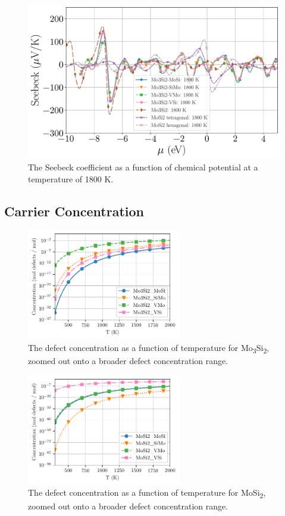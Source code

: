 \documentclass[7.5pt]{article}
\theoremstyle{plain}
\theoremstyle{definition}
\newcommand{\<}{\langle}
\renewcommand{\>}{\rangle}
\begin{document}
\begin{figure}[b!]
\centering
\includegraphics[width=\linewidth]{allmats_S_mu_temp_p}
\caption{The Seebeck coefficient as a function of chemical potential at a temperature of 1800 K.}
\label{fig:S-mu}
\end{figure}

\pagebreak
\clearpage
\subsection{Carrier Concentration}

\begin{figure}[b!]
\centering
  \includegraphics[width=0.6\textwidth]{mo3si2defects}
  \caption{The defect concentration as a function of temperature for Mo\textsubscript{3}Si\textsubscript{2}, zoomed out onto a broader defect concentration range.}
  \label{fig:carrier-concentration-mo3si2}
\end{figure}

\begin{figure}[b!]
\centering
  \includegraphics[width=0.6\textwidth]{mosi2defects}
  \caption{The defect concentration as a function of temperature for MoSi\textsubscript{2}, zoomed out onto a broader defect concentration range.}
  \label{fig:carrier-concentration-mosi2}
\end{figure}
\end{document}
